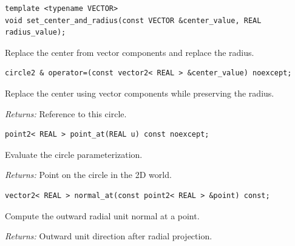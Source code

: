 \par\noindent\begin{minipage}{\linewidth}
\begin{lstlisting}[style=apireference]
template <typename VECTOR>
void set_center_and_radius(const VECTOR &center_value, REAL radius_value);
\end{lstlisting}
{\footnotesize Replace the center from vector components and replace the radius.\par}
\end{minipage}\par\vspace{1pt}
\par\noindent\begin{minipage}{\linewidth}
\begin{lstlisting}[style=apireference]
circle2 & operator=(const vector2< REAL > &center_value) noexcept;
\end{lstlisting}
{\footnotesize Replace the center using vector components while preserving the radius.\par}
{\footnotesize\textit{Returns:} Reference to this circle.\par}
\end{minipage}\par\vspace{1pt}
\par\noindent\begin{minipage}{\linewidth}
\begin{lstlisting}[style=apireference]
point2< REAL > point_at(REAL u) const noexcept;
\end{lstlisting}
{\footnotesize Evaluate the circle parameterization.\par}
{\footnotesize\textit{Returns:} Point on the circle in the 2D world.\par}
\end{minipage}\par\vspace{1pt}
\par\noindent\begin{minipage}{\linewidth}
\begin{lstlisting}[style=apireference]
vector2< REAL > normal_at(const point2< REAL > &point) const;
\end{lstlisting}
{\footnotesize Compute the outward radial unit normal at a point.\par}
{\footnotesize\textit{Returns:} Outward unit direction after radial projection.\par}
\end{minipage}\par\vspace{1pt}
